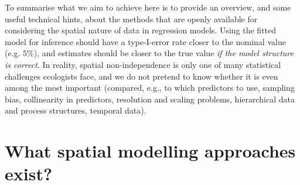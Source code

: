 \documentclass[11pt]{article}
\begin{document}
To summarise what we aim to achieve here is to provide an overview, and some useful technical hints, about the methods that are openly available for considering the spatial nature of data in regression models. Using the fitted model for inference should have a type-I-error rate closer to the nominal value (e.g. 5\%), and estimates should be closer to the true value \emph{if the model structure is correct}. In reality, spatial non-independence is only one of many statistical challenges ecologists face, and we do not pretend to know whether it is even among the most important (compared, e.g., to which predictors to use, sampling bias, collinearity in predictors, resolution and scaling problems, hierarchical data and process structures, temporal data).


\section{What spatial modelling approaches exist?}
\end{document}
